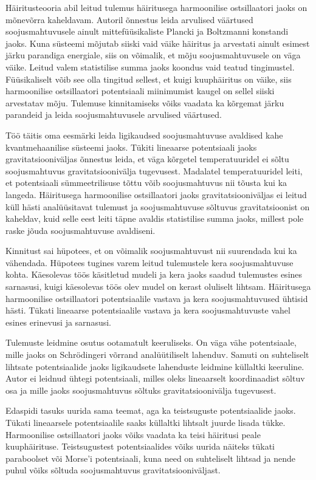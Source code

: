 \documentclass{trkut}%
\begin{document}
Häiritusteooria abil leitud tulemus häiritusega harmoonilise ostsillaatori jaoks on mõnevõrra kaheldavam.
Autoril õnnestus leida arvulised väärtused soojusmahtuvusele ainult mittefüüsikaliste Plancki ja Boltzmanni konstandi jaoks.
Kuna süsteemi mõjutab siiski vaid väike häiritus ja arvestati ainult esimest järku parandiga energiale, siis on võimalik, et mõju soojusmahtuvusele on väga väike.
Leitud valem statistilise summa jaoks koondus vaid teatud tingimustel.
Füüsikaliselt võib see olla tingitud sellest, et kuigi kuuphäiritus on väike, siis harmoonilise ostsillaatori potentsiaali miinimumist kaugel on sellel siiski arvestatav mõju.
Tulemuse kinnitamiseks võiks vaadata ka kõrgemat järku parandeid ja leida soojusmahtuvusele arvulised väärtused.



Töö täitis oma eesmärki leida ligikaudsed soojusmahtuvuse avaldised kahe kvantmehaanilise süsteemi jaoks.
Tükiti lineaarse potentsiaali jaoks gravitatsiooniväljas õnnestus leida, et väga kõrgetel temperatuuridel ei sõltu soojusmahtuvus gravitatsioonivälja tugevusest.
Madalatel temperatuuridel leiti, et potentsiaali sümmeetrilisuse tõttu võib soojusmahtuvus nii tõusta kui ka langeda.
Häiritusega harmoonilise ostsillaatori jaoks gravitatsiooniväljas ei leitud küll hästi analüüsitavat tulemust ja soojusmahtuvuse sõltuvus gravitatsioonist on kaheldav, kuid selle eest leiti täpne avaldis statistilise summa jaoks, millest pole raske jõuda soojusmahtuvuse avaldiseni.

Kinnitust sai hüpotees, et on võimalik soojusmahtuvust nii suurendada kui ka vähendada.
Hüpotees tugines varem leitud tulemustele kera soojusmahtuvuse kohta.
Käesolevas töös käsitletud mudeli ja kera jaoks saadud tulemustes esines sarnasusi, kuigi käesolevas töös olev mudel on kerast oluliselt lihtsam.
Häiritusega harmoonilise ostsillaatori potentsiaalile vastava ja kera soojusmahtuvused ühtisid hästi.
Tükati lineaarse potentsiaalile vastava ja kera soojusmahtuvuste vahel esines erinevusi ja sarnasusi.

Tulemuste leidmine osutus ootamatult keeruliseks.
On väga vähe potentsiaale, mille jaoks on Schrödingeri võrrand analüütiliselt lahenduv.
Samuti on suhteliselt lihtsate potentsiaalide jaoks ligikaudsete lahenduste leidmine küllaltki keeruline.
Autor ei leidnud ühtegi potentsiaali, milles oleks lineaarselt koordinaadist sõltuv osa ja mille jaoks soojusmahtuvus sõltuks gravitatsioonivälja tugevusest.

Edaspidi tasuks uurida sama teemat, aga ka teistsuguste potentsiaalide jaoks.
Tükati lineaarsele potentsiaalile saaks küllaltki lihtsalt juurde lisada tükke.
Harmoonilise ostsillaatori jaoks võiks vaadata ka teisi häiritusi peale kuuphäirituse.
Teistsugustest potentsiaalides võiks uurida näiteks tükati paraboolset või Morse'i potentsiaali, kuna need on suhteliselt lihtsad ja nende puhul võiks sõltuda soojusmahtuvus gravitatsiooniväljast.
\end{document}
